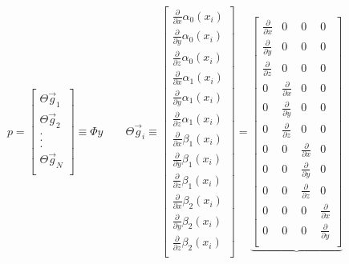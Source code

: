 \documentclass[10pt]{amsart}
\begin{document}
\[
p = 
\begin{bmatrix}
\Theta \vec{g}_1\\
\Theta \vec{g}_2\\
     .   \\
     .   \\
     .   \\
\Theta \vec{g}_N\\
\end{bmatrix} 
\equiv
\Phi y
\qquad
\Theta \vec{g}_i
\equiv
\begin{bmatrix} 
 \frac{\partial }{\partial x} \alpha_0(x_i) \\
 \frac{\partial }{\partial y} \alpha_0(x_i) \\
 \frac{\partial }{\partial z} \alpha_0(x_i) \\
 \frac{\partial }{\partial x} \alpha_1(x_i) \\
 \frac{\partial }{\partial y} \alpha_1(x_i) \\
 \frac{\partial }{\partial z} \alpha_1(x_i) \\
 \frac{\partial }{\partial x}  \beta_1(x_i) \\
 \frac{\partial }{\partial y}  \beta_1(x_i) \\
 \frac{\partial }{\partial z}  \beta_1(x_i) \\
 \frac{\partial }{\partial x}  \beta_2(x_i) \\
 \frac{\partial }{\partial y}  \beta_2(x_i) \\
 \frac{\partial }{\partial z}  \beta_2(x_i) \\
\end{bmatrix} 
=
\underbrace{
\begin{bmatrix} 
 \frac{\partial }{\partial x} & 0 & 0 & 0 \\
 \frac{\partial }{\partial y} & 0 & 0 & 0 \\
 \frac{\partial }{\partial z} & 0 & 0 & 0 \\
 0 & \frac{\partial }{\partial x} & 0 & 0 \\
 0 & \frac{\partial }{\partial y} & 0 & 0 \\
 0 & \frac{\partial }{\partial z} & 0 & 0 \\
 0 & 0 & \frac{\partial }{\partial x} & 0 \\
 0 & 0 & \frac{\partial }{\partial y} & 0 \\
 0 & 0 & \frac{\partial }{\partial z} & 0 \\
 0 & 0 & 0 & \frac{\partial }{\partial x} \\
 0 & 0 & 0 & \frac{\partial }{\partial y} \\

\end{bmatrix}}\]
\end{document}

